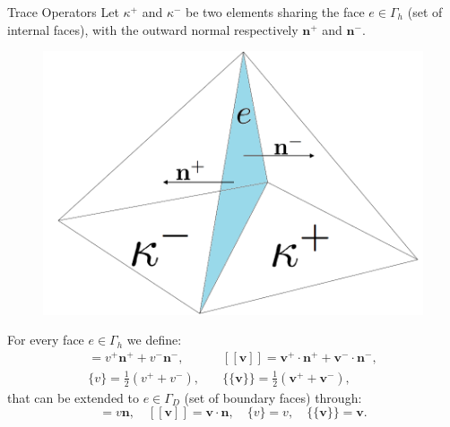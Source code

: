 \documentclass{beamer}
\begin{document}
\begin{frame}{Trace Operators}
	 Let $\kappa^+$ and $\kappa^-$ be two elements sharing the face
	 $e \in \Gamma_h$ (set of internal faces), with the outward normal
	 respectively $\mathbf{n}^+$ and
	 $\mathbf{n}^-$.\\
	\begin{figure}
		\centering
		\includegraphics[scale=0.13]{face}
		\end{figure}
	For every face $e \in \Gamma_h$ we define:
	\begin{align*}
	[v] = v^+ \mathbf{n}^+ + v^- \mathbf{n}^-,
	&\quad [\![ \mathbf{v} ]\!] = \mathbf{v}^+ \cdot \mathbf{n}^+ +
	\mathbf{v}^- \cdot \mathbf{n}^-,\\
	\{v\} = \frac{1}{2} (v^+ + v^-) ,
	& \quad \{\!\!\{ \mathbf{v} \}\!\!\} = \frac{1}{2} (\mathbf{v}^+
	+\mathbf{v}^-),
	\end{align*}
	that can be extended to $e \in \Gamma_D$ (set of boundary faces) through:
	\begin{equation*}
	[v] = v \mathbf{n},
	\quad [\![ \mathbf{v} ]\!] = \mathbf{v} \cdot \mathbf{n},
	\quad \{v\} = v,
	\quad \{\!\!\{ \mathbf{v} \}\!\!\} = \mathbf{v}.
	\end{equation*}
\end{frame}
\end{document}
